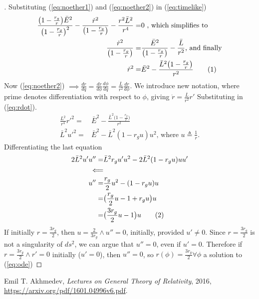 \documentclass[]{article}
\newcommand\numberthis{\addtocounter{equation}{1}\tag{\theequation}}
\begin{document}
\begin{proof}[]
	Substituting (\ref{eq:noether1}) and (\ref{eq:noether2}) in (\ref{eq:timelike})
	\begin{align*}
	\frac{\big(1-\frac{r_g}{r}\big) \bar{E}^2}{\big(1-\frac{r_g}{r}\big)^2} - \frac{\dot{r}^2}{\big(1-\frac{r_g}{r}\big)} - \frac{r^2 \bar{L}^2}{r^4} =& 0\text{ , which simplifies to}\\
	\frac{\dot{r}^2}{\big(1-\frac{r_g}{r}\big)} =& \frac{\bar{E}^2}{\big(1-\frac{r_g}{r}\big)} - \frac{\bar{L}}{r^2} \text{, and finally}\\
	\dot{r}^2 =& \bar{E}^2 - \frac{\bar{L}^2 \big(1-\frac{r_g}{r}\big)}{r^2} \numberthis \label{eq:rdot}
	\end{align*}
	Now (\ref{eq:noether2}) $\implies \frac{dr}{dq} = \frac{dr}{d\phi} \frac{d\phi}{dq} = \frac{\bar{L}}{r^2} \frac{dr}{d\phi}$. We introduce new notation, where prime denotes differentiation with respect to $\phi$, giving $\dot{r}=\frac{\bar{L}}{r^2} r'$ Substituting in (\ref{eq:rdot}). 
	\begin{align*}
	\frac{L^2}{r^4}r'^2 =& \bar{E}^2 - \frac{\bar{L}^2 \big(1-\frac{r_g}{r}\big)}{r^2}\\
	\bar{L}^2 u'^2=& \bar{E}^2 - \bar{L}^2 (1-r_g u) u^2 \text{, where $u\triangleq \frac{1}{r}$.}
	\end{align*}
	Differentiating the last equation
	\begin{align*}
	2 \bar{L}^2 u' u'' =& \bar{L}^2 r_g u' u^2 - 2 \bar{L}^2 (1-r_g u) u u' \\
	\Longleftarrow\\
	u'' =& \frac{r_g}{2} u^2 - (1 - r_g u) u\\
	=& \big( \frac{r_g}{2} u - 1 + r_g u\big) u\\
	=& \big( \frac{3 r_g}{2} u - 1 \big) u \numberthis \label{eq:ode}
	\end{align*}
	If initially $r=\frac{3 r_g}{2}$, then $u=\frac{2}{3 r_g} \land u''=0$, initially, provided $u'\neq 0$. Since $r=\frac{3 r_g}{2}$ is not a singularity of $ds^2$, we can argue that $u''=0$, even if $u'=0$. 
	 Therefore if $r=\frac{3 r_g}{2} \land r'=0$ initially ($u'=0$), then $u''=0$, so $r(\phi)=\frac{3 r_g}{2} \forall \phi$ a solution to (\ref{eq:ode})
\end{proof}

\begin{thebibliography}{9}
	
	Emil T. Akhmedev,
	\emph{Lectures on General Theory of Relativity},
	2016,
	\url{https://arxiv.org/pdf/1601.04996v6.pdf}.
	
\end{thebibliography}
\end{document}
